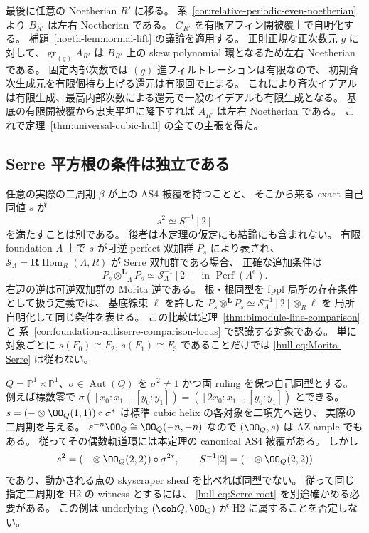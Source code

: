 最後に任意の Noetherian $R'$ に移る。
系~\ref{cor:relative-periodic-even-noetherian} より $B_{R'}$ は左右 Noetherian である。
$G_{R'}$ を有限アフィン開被覆上で自明化する。
補題~\ref{noeth-lem:normal-lift} の議論を適用する。
正則正規な正次数元 $g$ に対して、$\operatorname{gr}_{(g)}A_{R'}$ は
$B_{R'}$ 上の skew polynomial 環となるため左右 Noetherian である。
固定内部次数では $(g)$ 進フィルトレーションは有限なので、
初期斉次生成元を有限個持ち上げる還元は有限回で止まる。
これにより斉次イデアルは有限生成、最高内部次数による還元で一般のイデアルも有限生成となる。
基底の有限開被覆から忠実平坦に降下すれば $A_{R'}$ は左右 Noetherian である。
これで定理~\ref{thm:universal-cubic-hull} の全ての主張を得た。

\subsection{Serre 平方根の条件は独立である}

\begin{remark}
任意の実際の二周期 $\beta$ が上の AS4 被覆を持つことと、
そこから来る exact 自己同値 $s$ が
\[
 s^2\simeq S^{-1}[2]
 \tag{UH-20}\label{hull-eq:Serre-root}
\]
を満たすことは別である。
後者は本定理の仮定にも結論にも含まれない。
有限 foundation $\Lambda$ 上で $s$ が可逆 perfect 双加群 $P_s$ により表され、
$\mathcal S_\Lambda=\mathbf R\operatorname{Hom}_R(\Lambda,R)$ が Serre 双加群である場合、
正確な追加条件は
\[
 P_s\mathbin{\otimes^{\mathbf L}}_\Lambda P_s
    \simeq\mathcal S_\Lambda^{-1}[2]
 \quad\text{in }\operatorname{Perf}(\Lambda^e).
 \tag{UH-21}\label{hull-eq:Morita-Serre}
\]
右辺の逆は可逆双加群の Morita 逆である。
根・根同型を fppf 局所の存在条件として扱う定義では、
基底線束 $\ell$ を許した
$P_s\mathbin{\otimes^{\mathbf L}} P_s\simeq\mathcal S_\Lambda^{-1}[2]\otimes_R\ell$ を
局所自明化して同じ条件を表せる。
この比較は定理~\ref{thm:bimodule-line-comparison} と
系~\ref{cor:foundation-antiserre-comparison-locus} で認識する対象である。
単に対象ごとに $s(F_0)\cong F_2$, $s(F_1)\cong F_3$ であることだけでは
\eqref{hull-eq:Morita-Serre} は従わない。
\end{remark}

\begin{example}
$Q=\mathbb P^1\times\mathbb P^1$、$\sigma\in\operatorname{Aut}(Q)$ を
$\sigma^2\ne1$ かつ両 ruling を保つ自己同型とする。
例えば標数零で
$\sigma([x_0:x_1],[y_0:y_1])=([2x_0:x_1],[y_0:y_1])$ とできる。
$s=(-\otimes\OO_Q(1,1))\circ\sigma^*$ は標準 cubic helix の各対象を二項先へ送り、
実際の二周期を与える。
$s^{-n}\OO_Q\cong\OO_Q(-n,-n)$ なので $(\OO_Q,s)$ は AZ ample でもある。
従ってその偶数軌道環には本定理の canonical AS4 被覆がある。
しかし
\[
 s^2=(-\otimes\OO_Q(2,2))\circ\sigma^{2*},\qquad
 S^{-1}[2]=(-\otimes\OO_Q(2,2))
\]
であり、動かされる点の skyscraper sheaf を比べれば同型でない。
従って同じ指定二周期を H2 の witness とするには、
\eqref{hull-eq:Serre-root} を別途確かめる必要がある。
この例は underlying $(\coh Q,\OO_Q)$ が H2 に属することを否定しない。
\end{example}

